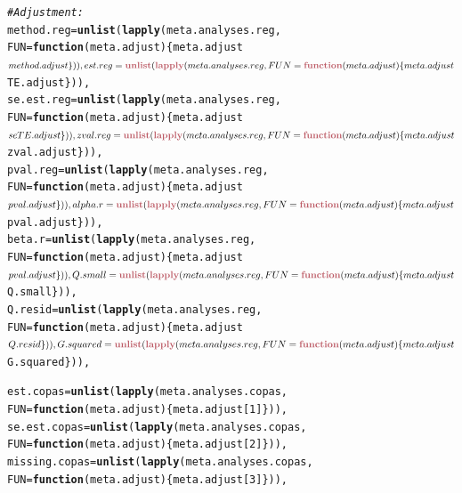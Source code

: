 \documentclass[11pt,a4paper,twoside]{book}\usepackage[]{graphicx}\usepackage[]{color}
\makeatletter
\newcommand{\hlcom}[1]{\textcolor[rgb]{0.678,0.584,0.686}{\textit{#1}}}%
\newcommand{\hlkwd}[1]{\textcolor[rgb]{0.737,0.353,0.396}{\textbf{#1}}}%
\newenvironment{kframe}{%
 \def\at@end@of@kframe{}%
 \ifinner\ifhmode%
  \def\at@end@of@kframe{\end{minipage}}%
  \begin{minipage}{\columnwidth}%
 \fi\fi%
 \def\FrameCommand##1{\hskip\@totalleftmargin \hskip-\fboxsep
 \colorbox{shadecolor}{##1}\hskip-\fboxsep
     \hskip-\linewidth \hskip-\@totalleftmargin \hskip\columnwidth}%
 \MakeFramed {\advance\hsize-\width
   \@totalleftmargin\z@ \linewidth\hsize
   \@setminipage}}%
 {\par\unskip\endMakeFramed%
 \at@end@of@kframe}
\newenvironment{knitrout}{}{} %
\makeatother
\begin{document}
\begin{knitrout}
\begin{kframe}
\begin{alltt}
\hlcom{  #Adjustment:}
  method.reg = \hlkwd{unlist}(\hlkwd{lapply}(meta.analyses.reg, 
                      FUN = \hlkwd{function}(meta.adjust)\{meta.adjust$method.adjust\})),
  est.reg = \hlkwd{unlist}(\hlkwd{lapply}(meta.analyses.reg, 
                      FUN = \hlkwd{function}(meta.adjust)\{meta.adjust$TE.adjust\})),
  se.est.reg = \hlkwd{unlist}(\hlkwd{lapply}(meta.analyses.reg, 
                      FUN = \hlkwd{function}(meta.adjust)\{meta.adjust$seTE.adjust\})),
  zval.reg = \hlkwd{unlist}(\hlkwd{lapply}(meta.analyses.reg, 
                      FUN = \hlkwd{function}(meta.adjust)\{meta.adjust$zval.adjust\})),
  pval.reg = \hlkwd{unlist}(\hlkwd{lapply}(meta.analyses.reg, 
                      FUN = \hlkwd{function}(meta.adjust)\{meta.adjust$pval.adjust\})),
  alpha.r = \hlkwd{unlist}(\hlkwd{lapply}(meta.analyses.reg, 
                      FUN = \hlkwd{function}(meta.adjust)\{meta.adjust$pval.adjust\})),
  beta.r = \hlkwd{unlist}(\hlkwd{lapply}(meta.analyses.reg, 
                      FUN = \hlkwd{function}(meta.adjust)\{meta.adjust$pval.adjust\})),
  Q.small = \hlkwd{unlist}(\hlkwd{lapply}(meta.analyses.reg, 
                      FUN = \hlkwd{function}(meta.adjust)\{meta.adjust$Q.small\})),
  Q.resid = \hlkwd{unlist}(\hlkwd{lapply}(meta.analyses.reg, 
                      FUN = \hlkwd{function}(meta.adjust)\{meta.adjust$Q.resid\})),
  G.squared = \hlkwd{unlist}(\hlkwd{lapply}(meta.analyses.reg, 
                      FUN = \hlkwd{function}(meta.adjust)\{meta.adjust$G.squared\})),
  
  est.copas = \hlkwd{unlist}(\hlkwd{lapply}(meta.analyses.copas, 
                      FUN = \hlkwd{function}(meta.adjust)\{meta.adjust[1]\})),
  se.est.copas = \hlkwd{unlist}(\hlkwd{lapply}(meta.analyses.copas, 
                      FUN = \hlkwd{function}(meta.adjust)\{meta.adjust[2]\})),
  missing.copas = \hlkwd{unlist}(\hlkwd{lapply}(meta.analyses.copas, 
                      FUN = \hlkwd{function}(meta.adjust)\{meta.adjust[3]\})),
  

\end{alltt}
\end{kframe}
\end{knitrout}
\end{document}
